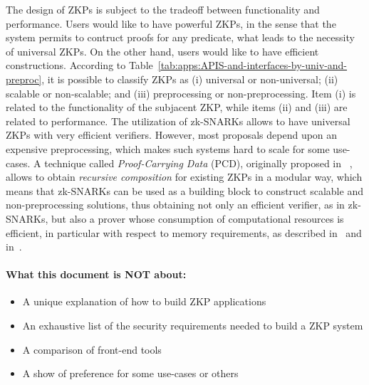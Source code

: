 The design of ZKPs is subject to the tradeoff between functionality and performance. Users would like to have powerful ZKPs, in the sense that the system permits to contruct proofs for any predicate, what leads to the necessity of universal ZKPs. On the other hand, users would like to have efficient constructions. According to Table~\ref{tab:apps:APIS-and-interfaces-by-univ-and-preproc}, it is possible to classify ZKPs as (i) universal or non-universal; (ii) scalable or non-scalable; and (iii) preprocessing or non-preprocessing. Item (i) is related to the functionality of the subjacent ZKP, while items (ii) and (iii) are related to performance. The utilization of zk-SNARKs allows to have universal ZKPs with very efficient verifiers. However, most proposals depend upon an expensive preprocessing, which makes such systems hard to scale for some use-cases. A technique called \textit{Proof-Carrying Data} (PCD), originally proposed in ~\cite{2010:ICS:proof-carrying-data}, allows to obtain \textit{recursive composition} for existing ZKPs in a modular way, which means that zk-SNARKs can be used as a building block to construct scalable and non-preprocessing solutions, thus obtaining not only an efficient verifier, as in zk-SNARKs, but also a prover whose consumption of computational resources is efficient, in particular with respect to memory requirements, as described in~\cite{2017:Alg:Scalable-Zero-Knowledge-Via-Cycles-of-Elliptic-Curves} and in~\cite{2013:Recursive-Composition-and-Bootstrapping-for-SNARKS-and-Proof-carrying-Data}.


\paragraph{What this document is NOT about:}
\begin{itemize}
 \item A unique explanation of how to build ZKP applications
 \item An exhaustive list of the security requirements needed to build a ZKP system
 \item A comparison of front-end tools
 \item A show of preference for some use-cases or others
\end{itemize}

